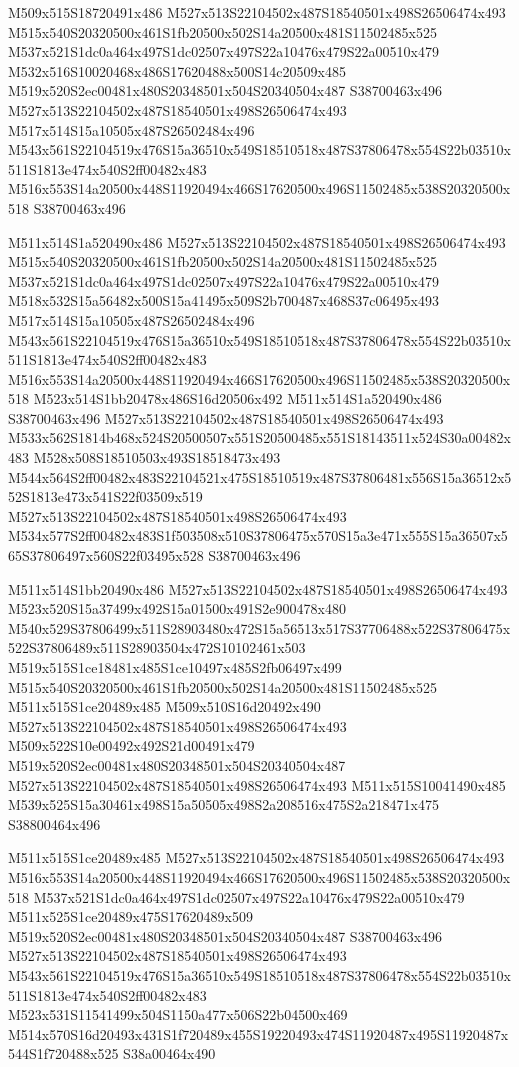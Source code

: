 \documentclass{article}
\begin{document}
\begin{multicols}{2}
M509x515S18720491x486 M527x513S22104502x487S18540501x498S26506474x493 M515x540S20320500x461S1fb20500x502S14a20500x481S11502485x525 M537x521S1dc0a464x497S1dc02507x497S22a10476x479S22a00510x479 M532x516S10020468x486S17620488x500S14c20509x485 M519x520S2ec00481x480S20348501x504S20340504x487 S38700463x496 M527x513S22104502x487S18540501x498S26506474x493 M517x514S15a10505x487S26502484x496 M543x561S22104519x476S15a36510x549S18510518x487S37806478x554S22b03510x511S1813e474x540S2ff00482x483 M516x553S14a20500x448S11920494x466S17620500x496S11502485x538S20320500x518 S38700463x496

M511x514S1a520490x486 M527x513S22104502x487S18540501x498S26506474x493 M515x540S20320500x461S1fb20500x502S14a20500x481S11502485x525 M537x521S1dc0a464x497S1dc02507x497S22a10476x479S22a00510x479 M518x532S15a56482x500S15a41495x509S2b700487x468S37c06495x493 M517x514S15a10505x487S26502484x496 M543x561S22104519x476S15a36510x549S18510518x487S37806478x554S22b03510x511S1813e474x540S2ff00482x483 M516x553S14a20500x448S11920494x466S17620500x496S11502485x538S20320500x518 M523x514S1bb20478x486S16d20506x492 M511x514S1a520490x486 S38700463x496 M527x513S22104502x487S18540501x498S26506474x493 M533x562S1814b468x524S20500507x551S20500485x551S18143511x524S30a00482x483 M528x508S18510503x493S18518473x493 M544x564S2ff00482x483S22104521x475S18510519x487S37806481x556S15a36512x552S1813e473x541S22f03509x519 M527x513S22104502x487S18540501x498S26506474x493 M534x577S2ff00482x483S1f503508x510S37806475x570S15a3e471x555S15a36507x565S37806497x560S22f03495x528 S38700463x496

M511x514S1bb20490x486 M527x513S22104502x487S18540501x498S26506474x493 M523x520S15a37499x492S15a01500x491S2e900478x480 M540x529S37806499x511S28903480x472S15a56513x517S37706488x522S37806475x522S37806489x511S28903504x472S10102461x503 M519x515S1ce18481x485S1ce10497x485S2fb06497x499 M515x540S20320500x461S1fb20500x502S14a20500x481S11502485x525 M511x515S1ce20489x485 M509x510S16d20492x490 M527x513S22104502x487S18540501x498S26506474x493 M509x522S10e00492x492S21d00491x479 M519x520S2ec00481x480S20348501x504S20340504x487 M527x513S22104502x487S18540501x498S26506474x493 M511x515S10041490x485 M539x525S15a30461x498S15a50505x498S2a208516x475S2a218471x475 S38800464x496

M511x515S1ce20489x485 M527x513S22104502x487S18540501x498S26506474x493 M516x553S14a20500x448S11920494x466S17620500x496S11502485x538S20320500x518 M537x521S1dc0a464x497S1dc02507x497S22a10476x479S22a00510x479 M511x525S1ce20489x475S17620489x509 M519x520S2ec00481x480S20348501x504S20340504x487 S38700463x496 M527x513S22104502x487S18540501x498S26506474x493 M543x561S22104519x476S15a36510x549S18510518x487S37806478x554S22b03510x511S1813e474x540S2ff00482x483 M523x531S11541499x504S1150a477x506S22b04500x469 M514x570S16d20493x431S1f720489x455S19220493x474S11920487x495S11920487x544S1f720488x525 S38a00464x490


\end{multicols}
\end{document}
